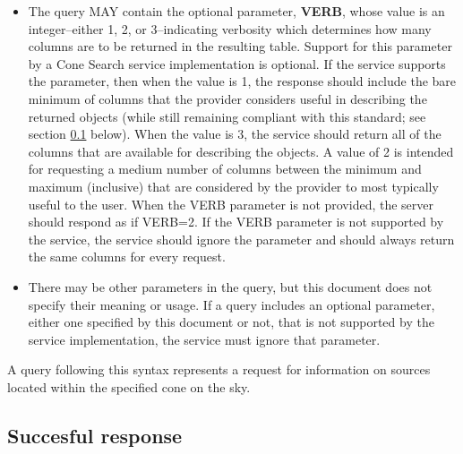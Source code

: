 \documentclass[11pt,a4paper]{ivoa}
\begin{document}
\begin{itemize}
		\item The query MAY contain the optional parameter,
			\textbf{VERB}, whose value is an integer--either 1, 2, or 3--indicating
			verbosity which determines how many columns are to be returned in the
			resulting table. Support for this parameter by a Cone Search service
			implementation is optional. If the service supports the parameter, then
			when the value is 1, the response should include the bare minimum of
			columns that the provider considers useful in describing the returned
			objects (while still remaining compliant with this standard; see section
			\ref{subsec:response} below). When the value is 3, the service should return all of the
			columns that are available for describing the objects. A value of 2 is
			intended for requesting a medium number of columns between the minimum
			and maximum (inclusive) that are considered by the provider to most
			typically useful to the user. When the VERB parameter is not provided,
			the server should respond as if VERB=2. If the VERB parameter is not
			supported by the service, the service should ignore the parameter and
			should always return the same columns for every request.
		\item There may be other parameters in the query, but this document does not
			specify their meaning or usage. If a query includes an optional parameter,
			either one specified by this document or not, that is not supported by
			the service implementation, the service must ignore that parameter.
	\end{itemize}
	
	A query following this syntax represents a request for
	information on sources located within the specified cone on the sky.

\subsection{Succesful response}
\label{subsec:response}
\end{document}

